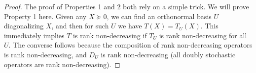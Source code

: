 \documentclass[12pt]{article}
\begin{document}
\begin{proof}
    The proof of Properties 1 and 2 both rely on a simple trick. We will prove Property 1 here. Given any $X \succeq 0$, we can find an orthonormal basis $U$ diagonalizing $X$, and then for such $U$ we have $T(X) = T_U(X)$. This immediately implies $T$ is rank non-decreasing if $T_U$ is rank non-decreasing for all $U$. The converse follows because the composition of rank non-decreasing operators is rank non-decreasing, and $D_U$ is rank non-decreasing (all doubly stochastic operators are rank non-decreasing).
\end{proof}
\end{document}
